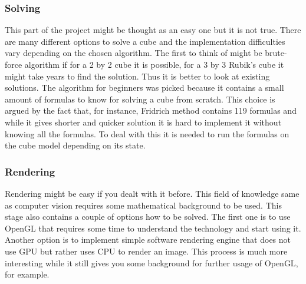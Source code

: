 \documentclass[../../main.tex]{subfiles}
\begin{document}
\subsubsection*{Solving}

This part of the project might be thought as an easy one but it is not true. There are many different options to solve a cube and the implementation difficulties vary depending on the chosen algorithm. The first to think of might be brute-force algorithm if for a 2 by 2 cube it is possible, for a 3 by 3 Rubik's cube it might take years to find the solution. Thus it is better to look at existing solutions. The algorithm for beginners was picked because it contains a small amount of formulas to know for solving a cube from scratch. This choice is argued by the fact that, for instance, Fridrich method contains 119 formulas and while it gives shorter and quicker solution it is hard to implement it without knowing all the formulas. To deal with this it is needed to run the formulas on the cube model depending on its state.

\subsubsection*{Rendering}
\label{subsec:rendering}

Rendering might be easy if you dealt with it before. This field of knowledge same as computer vision requires some mathematical background to be used. This stage also contains a couple of options how to be solved. The first one is to use \ac{OpenGL} that requires some time to understand the technology and start using it. Another option is to implement simple software rendering engine that does not use \ac{GPU} but rather uses \ac{CPU} to render an image. This process is much more interesting while it still gives you some background for further usage of \ac{OpenGL}, for example.
\end{document}

